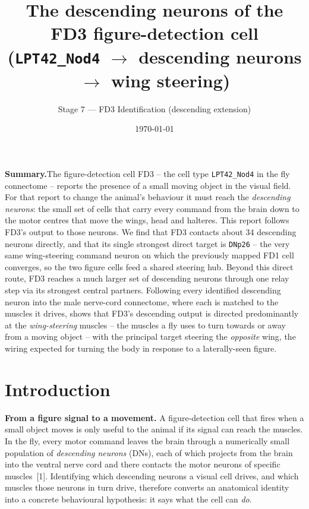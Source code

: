 \documentclass[11pt]{article}
\newcommand{\ttt}[1]{\texttt{#1}}
\begin{document}
\title{\textbf{The descending neurons of the FD3 figure-detection cell (\ttt{LPT42\_Nod4} $\rightarrow$ descending neurons $\rightarrow$ wing steering)}}

\author{Stage 7 --- FD3 Identification (descending extension)}

\date{\today}

\maketitle

\textbf{Summary.}\quad The figure-detection cell FD3 -- the cell type \ttt{LPT42\_Nod4} in the fly connectome -- reports the presence of a small moving object in the visual field. For that report to change the animal's behaviour it must reach the \emph{descending neurons}: the small set of cells that carry every command from the brain down to the motor centres that move the wings, head and halteres. This report follows FD3's output to those neurons. We find that FD3 contacts about 34 descending neurons directly, and that its single strongest direct target is \ttt{DNp26} -- the very same wing-steering command neuron on which the previously mapped FD1 cell converges, so the two figure cells feed a shared steering hub. Beyond this direct route, FD3 reaches a much larger set of descending neurons through one relay step via its strongest central partners. Following every identified descending neuron into the male nerve-cord connectome, where each is matched to the muscles it drives, shows that FD3's descending output is directed predominantly at the \emph{wing-steering} muscles -- the muscles a fly uses to turn towards or away from a moving object -- with the principal target steering the \emph{opposite} wing, the wiring expected for turning the body in response to a laterally-seen figure.

\section{Introduction}

\textbf{From a figure signal to a movement.}\quad
A figure-detection cell that fires when a small object moves is only useful to the animal if its
signal can reach the muscles. In the fly, every motor command leaves the brain through a
numerically small population of \emph{descending neurons} (DNs), each of which projects from the
brain into the ventral nerve cord and there contacts the motor neurons of specific muscles~[1].
Identifying which descending neurons a visual cell drives, and which muscles those neurons in turn
drive, therefore converts an anatomical identity into a concrete behavioural hypothesis: it says
what the cell can \emph{do}.
\end{document}
